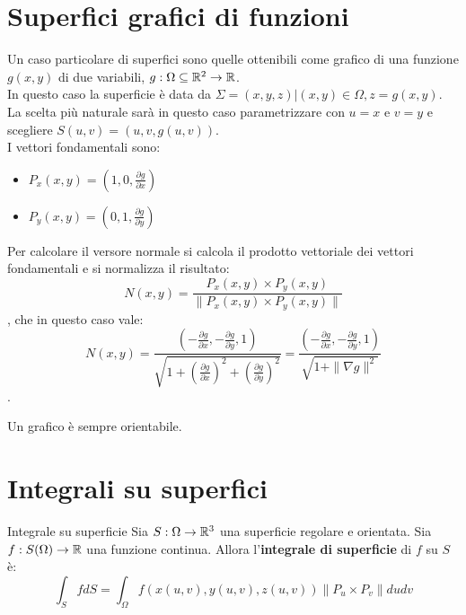 \section{Superfici grafici di funzioni}
Un caso particolare di superfici sono quelle ottenibili come grafico di una funzione $g(x,y)$ di due variabili, $g:\Omega \subseteq \mathbb{R}^2  \to \mathbb{R}$.\\
In questo caso la superficie è data da $\Sigma = {(x,y,z)|(x,y)\in \Omega, z=g(x,y)}$.\\
La scelta più naturale sarà in questo caso parametrizzare con $u=x$ e $v=y$ e scegliere $S(u,v)=(u,v,g(u,v))$.\\
I vettori fondamentali sono:
\begin{itemize}
  \item $P_x(x,y)=(1,0,\frac{\partial g}{\partial x})$
  \item $P_y(x,y)=(0,1,\frac{\partial g}{\partial y})$
\end{itemize}
Per calcolare il versore normale si calcola il prodotto vettoriale dei vettori fondamentali e si normalizza il risultato:
$$N(x,y)=\frac{P_x(x,y)\times P_y(x,y)}{\|P_x(x,y)\times P_y(x,y)\|}$$, che in questo caso vale:
$$N(x,y)=\frac{(-\frac{\partial g}{\partial x},-\frac{\partial g}{\partial y},1)}{\sqrt{1+(\frac{\partial g}{\partial x})^2+(\frac{\partial g}{\partial y})^2}}=\frac{(-\frac{\partial g}{\partial x},-\frac{\partial g}{\partial y},1)}{\sqrt{1+\|\nabla g\|^2}}$$.

\begin{osservazione}{}
  Un grafico è sempre orientabile.
\end{osservazione}

\section{Integrali su superfici}
\begin{definizione}{Integrale su superficie}
  Sia $S:\Omega\to\mathbb{R}^3$ una superficie regolare e orientata. Sia $f:S(\Omega)\to\mathbb{R}$ una funzione continua. Allora l'\textbf{integrale di superficie} di $f$ su $S$ è:
  $$\int_{S} f dS = \int_{\Omega} f(x(u,v),y(u,v),z(u,v))\|P_u\times P_v\|dudv$$
\end{definizione}

